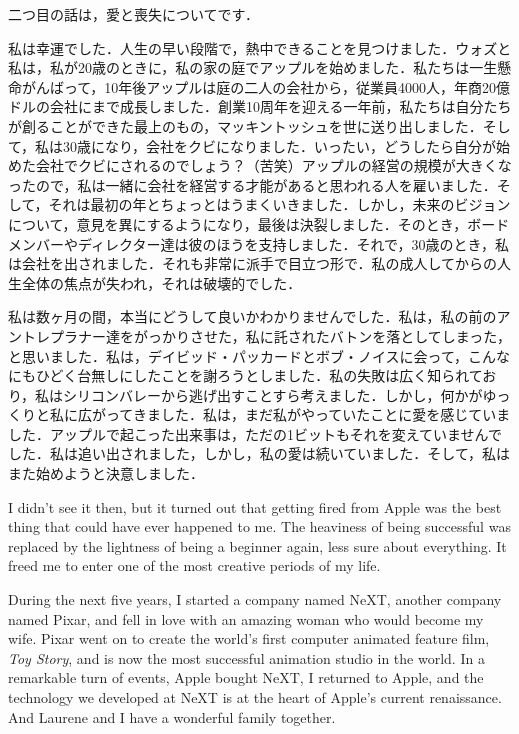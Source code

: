 \documentclass[twocolumn]{jsarticle}
\begin{document}
二つ目の話は，愛と喪失についてです．


私は幸運でした．人生の早い段階で，熱中できることを見つけました．ウォズと私は，私が20歳のときに，私の家の庭でアップルを始めました．私たちは一生懸命がんばって，10年後アップルは庭の二人の会社から，従業員4000人，年商20億ドルの会社にまで成長しました．創業10周年を迎える一年前，私たちは自分たちが創ることができた最上のもの，マッキントッシュを世に送り出しました．そして，私は30歳になり，会社をクビになりました．いったい，どうしたら自分が始めた会社でクビにされるのでしょう？（苦笑）アップルの経営の規模が大きくなったので，私は一緒に会社を経営する才能があると思われる人を雇いました．そして，それは最初の年とちょっとはうまくいきました．しかし，未来のビジョンについて，意見を異にするようになり，最後は決裂しました．そのとき，ボードメンバーやディレクター達は彼のほうを支持しました．それで，30歳のとき，私は会社を出されました．それも非常に派手で目立つ形で．私の成人してからの人生全体の焦点が失われ，それは破壊的でした．

私は数ヶ月の間，本当にどうして良いかわかりませんでした．私は，私の前のアントレプラナー達をがっかりさせた，私に託されたバトンを落としてしまった，と思いました．私は，デイビッド・パッカードとボブ・ノイスに会って，こんなにもひどく台無しにしたことを謝ろうとしました．私の失敗は広く知られており，私はシリコンバレーから逃げ出すことすら考えました．しかし，何かがゆっくりと私に広がってきました．私は，まだ私がやっていたことに愛を感じていました．アップルで起こった出来事は，ただの1ビットもそれを変えていませんでした．私は追い出されました，しかし，私の愛は続いていました．そして，私はまた始めようと決意しました．

\newpage

I didn't see it then, but it turned out that getting fired from Apple was the best thing that could have ever happened to me. The heaviness of being successful was replaced by the lightness of being a beginner again, less sure about everything. It freed me to enter one of the most creative periods of my life.

During the next five years, I started a company named NeXT, another company named Pixar, and fell in love with an amazing woman who would become my wife. Pixar went on to create the world's first computer animated feature film, \textit{Toy Story}, and is now the most successful animation studio in the world. In a remarkable turn of events, Apple bought NeXT, I returned to Apple, and the technology we developed at NeXT is at the heart of Apple's current renaissance. And Laurene and I have a wonderful family together.
\end{document}
